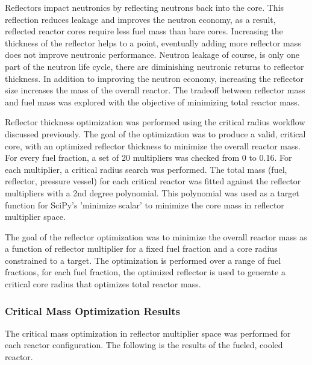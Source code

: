 Reflectors impact neutronics by reflecting neutrons back into the core. This
reflection reduces leakage and improves the neutron economy, as a result,
reflected reactor cores require less fuel mass than bare cores. Increasing the
thickness of the reflector helps to a point, eventually adding more reflector
mass does not improve neutronic performance. Neutron leakage of course, is only
one part of the neutron life cycle, there are diminishing neutronic returns to
reflector thickness. In addition to improving the neutron economy, increasing
the reflector size increases the mass of the overall reactor. The tradeoff
between reflector mass and fuel mass was explored with the objective of
minimizing total reactor mass. 

Reflector thickness optimization was performed using the critical radius
workflow discussed previously. The goal of the optimization was to produce a
valid, critical core, with an optimized reflector thickness to minimize the
overall reactor mass. For every fuel fraction, a set of 20 multipliers was
checked from 0 to 0.16. For each multiplier, a critical radius search was
performed. The total mass (fuel, reflector, pressure vessel) for each critical
reactor was fitted against the reflector multipliers with a 2nd degree
polynomial. This polynomial was used as a target function for SciPy's
'minimize scalar' to minimize the core mass in reflector multiplier space.

The goal of the reflector optimization was to minimize the overall reactor mass
as a function of reflector multiplier for a fixed fuel fraction and a core
radius constrained to a \keff target. The optimization is performed over a range
of fuel fractions, for each fuel fraction, the optimized reflector is used to
generate a critical core radius that optimizes total reactor mass.


\subsubsection{Critical Mass Optimization Results}

The critical mass optimization in reflector multiplier space was performed for
each reactor configuration. The following is the results of the \uox fueled,
\codiox cooled reactor.

